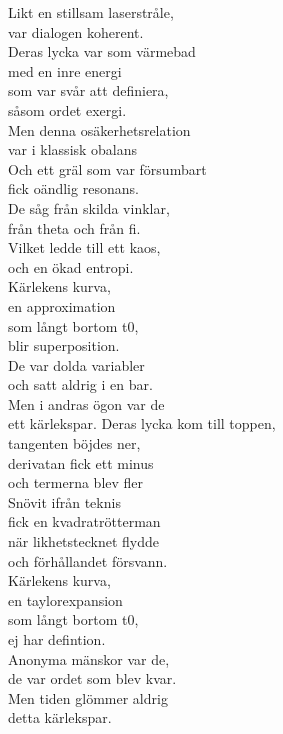 \documentclass[a6paper,10pt]{article}
\begin{document}
\begin{lyrics}
Likt en stillsam laserstråle, \\
var dialogen koherent. \\
Deras lycka var som värmebad \\
med en inre energi \\
som var svår att definiera, \\
såsom ordet exergi.
\vspace{5pt}\\
Men denna osäkerhetsrelation \\
var i klassisk obalans \\
Och ett gräl som var försumbart \\
fick oändlig resonans. \\
De såg från skilda vinklar, \\
från theta och från fi. \\
Vilket ledde till ett kaos, \\
och en ökad entropi.
\vspace{5pt}\\
Kärlekens kurva, \\
en approximation \\
som långt bortom t0, \\
blir superposition. \\
De var dolda variabler \\
och satt aldrig i en bar. \\
Men i andras ögon var de \\
ett kärlekspar. 
\newpage
\setlength{\oddsidemargin}{-0.37in}
\noindent
Deras lycka kom till toppen, \\
tangenten böjdes ner, \\
derivatan fick ett minus \\
och termerna blev fler \\
Snövit ifrån teknis \\
fick en kvadratrötterman \\
när likhetstecknet flydde \\
och förhållandet försvann.
\vspace{5pt}\\
Kärlekens kurva, \\
en taylorexpansion \\
som långt bortom t0, \\
ej har defintion. \\
Anonyma mänskor var de, \\
de var ordet som blev kvar. \\
Men tiden glömmer aldrig \\
detta kärlekspar.
\end{lyrics}
\end{document}
